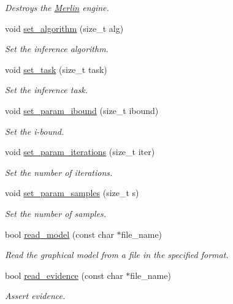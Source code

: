 \begin{DoxyCompactItemize}
\begin{DoxyCompactList}\small\item\em Destroys the \hyperlink{classMerlin}{Merlin} engine. \end{DoxyCompactList}\item 
void \hyperlink{classMerlin_ace7eaef0491f3df0a611ced2cca2bb64}{set\+\_\+algorithm} (size\+\_\+t alg)
\begin{DoxyCompactList}\small\item\em Set the inference algorithm. \end{DoxyCompactList}\item 
void \hyperlink{classMerlin_ad19ecb3ca412ea73e31957f6211ec3bc}{set\+\_\+task} (size\+\_\+t task)
\begin{DoxyCompactList}\small\item\em Set the inference task. \end{DoxyCompactList}\item 
void \hyperlink{classMerlin_a705faedd6fceb577f5ab905bae15fccc}{set\+\_\+param\+\_\+ibound} (size\+\_\+t ibound)
\begin{DoxyCompactList}\small\item\em Set the i-\/bound. \end{DoxyCompactList}\item 
void \hyperlink{classMerlin_aeed11e66a08f12721cc289e3ee40b468}{set\+\_\+param\+\_\+iterations} (size\+\_\+t iter)
\begin{DoxyCompactList}\small\item\em Set the number of iterations. \end{DoxyCompactList}\item 
void \hyperlink{classMerlin_a38bcd618a470b2146148388cfbaa1315}{set\+\_\+param\+\_\+samples} (size\+\_\+t s)
\begin{DoxyCompactList}\small\item\em Set the number of samples. \end{DoxyCompactList}\item 
bool \hyperlink{classMerlin_a956c3f072f55bd43cd272cfacfeb6459}{read\+\_\+model} (const char $\ast$file\+\_\+name)
\begin{DoxyCompactList}\small\item\em Read the graphical model from a file in the specified format. \end{DoxyCompactList}\item 
bool \hyperlink{classMerlin_a017d85ac012c8c26cd5db85e181ded3a}{read\+\_\+evidence} (const char $\ast$file\+\_\+name)
\begin{DoxyCompactList}\small\item\em Assert evidence. \end{DoxyCompactList}\item 

\end{DoxyCompactItemize}
